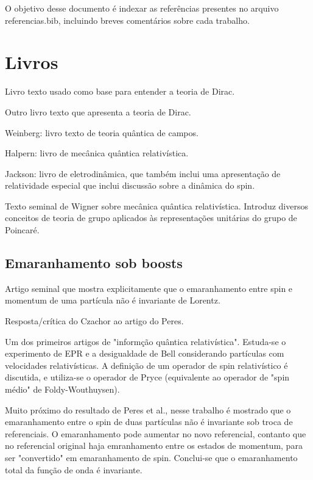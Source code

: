 \documentclass[11pt,a4paper,notitlepage]{article}
\begin{document}
\newcommand{\be}{\begin{eqnarray}}
\newcommand{\ee}{\end{eqnarray}}
\newcommand{\ket}[1]{\mbox{$ | #1 \rangle $}}
\newcommand{\bra}[1]{\mbox{$ \langle #1 | $}}
\newcommand{\Unit}{\mathbb{1}}
\newcommand{\Hop}{\mathcal{H}}

O objetivo desse documento é indexar as referências presentes no arquivo referencias.bib, incluindo breves comentários sobre cada trabalho.

\section{Livros}

\cite{sakurai} Livro texto usado como base para entender a teoria de Dirac.

\cite{drell} Outro livro texto que apresenta a teoria de Dirac.

\cite{weinberg} Weinberg: livro texto de teoria quântica de campos.

\cite{halpern_1968} Halpern: livro de mecânica quântica relativística.

\cite{jackson_1975} Jackson: livro de eletrodinâmica, que também inclui uma apresentação de relatividade especial que inclui discussão sobre a dinâmica do spin.

\cite{wigner_1939} Texto seminal de Wigner sobre mecânica quântica relativística. Introduz diversos conceitos de teoria de grupo aplicados às representações unitárias do grupo de Poincaré.

\subsection*{Emaranhamento sob boosts}

\cite{peres2002} Artigo seminal que mostra explicitamente que o emaranhamento entre spin e momentum de uma partícula não é invariante de Lorentz.

\cite{czachor_2005} Resposta/crítica do Czachor ao artigo do Peres.

\cite{czachor_1997} Um dos primeiros artigos de "informção quântica relativística". Estuda-se o experimento de EPR e a desigualdade de Bell considerando partículas com velocidades relativísticas. A definição de um operador de spin relativístico é discutida, e utiliza-se o operador de Pryce (equivalente ao operador de "spin médio" de Foldy-Wouthuysen).

\cite{gingrich_adami_2002} Muito próximo do resultado de Peres et al., nesse trabalho é mostrado que o emaranhamento entre o spin de duas partículas não é invariante sob troca de referenciais. O emaranhamento pode aumentar no novo referencial, contanto que no referencial original haja emranhamento entre os estados de momentum, para ser "convertido" em emaranhamento de spin. Conclui-se que o emaranhamento total da função de onda é invariante.
\end{document}
